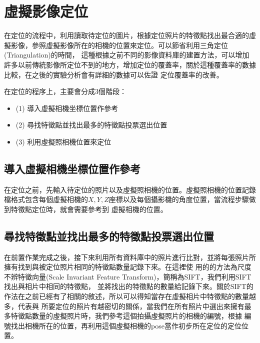 \section{虛擬影像定位}

%
	在定位的流程中，利用讀取待定位的圖片，根據定位照片的特徵點找出最合適的虛擬影像，參照虛擬影像所在的相機的位置來定位。可以節省利用三角定位(Triangulation)的時間，
	這種根據之前不同的影像資料庫的建置方法，可以增加許多以前傳統影像所定位不到的地方，增加定位的覆蓋率，關於這種覆蓋率的數據比較，在之後的實驗分析會有詳細的數據可以佐證
	定位覆蓋率的改善。
	
	在定位的程序上，主要會分成3個階段：
		\begin{itemize}
			\item (1) 導入虛擬相機坐標位置作參考
    		\item (2) 尋找特徵點並找出最多的特徵點投票選出位置
    		\item (3) 利用虛擬照相機位置來定位
		\end{itemize} 
	
	
\subsection{導入虛擬相機坐標位置作參考}	

	在定位之前，先輸入待定位的照片以及虛擬照相機的位置。虛擬照相機的位置記錄檔格式包含每個虛擬相機的$X,Y,Z$座標以及每個攝影機的角度位置，當流程步驟做到特徵點定位時，就會需要參考到
	虛擬相機的位置。
		
\subsection{尋找特徵點並找出最多的特徵點投票選出位置}	

	在前置作業完成之後，接下來利用所有資料庫中的照片進行比對，並將每張照片所擁有找到與被定位照片相同的特徵點數量記錄下來。在這裡使
	用的的方法為尺度不辨特徵向量(Scale Invariant Feature Transform)，簡稱為SIFT，我們利用SIFT找出與相片中相同的特徵點，
	並將找出的特徵點的數量給記錄下來。關於SIFT的作法在之前已經有了相關的敘述，所以可以得知當存在虛擬相片中特徵點的數量越多，代表與
	所要定位的照片有越密切的關係，當我們在所有照片中選出來擁有最多特徵點數量的虛擬照片時，我們參考這個拍攝虛擬照片的相機的編號，根據
	編號找出相機所在的位置，再利用這個虛擬相機的pose當作初步所在定位的定位位置。
	
